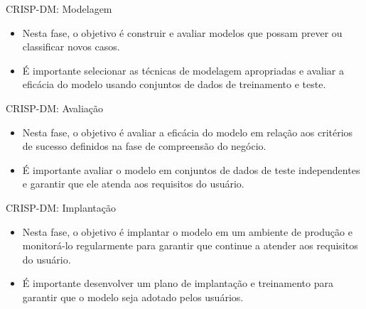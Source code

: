 \documentclass[
  ignorenonframetext,
  aspectratio=169,
]{beamer}
\providecommand{\tightlist}{%
  \setlength{\itemsep}{0pt}\setlength{\parskip}{0pt}}
\begin{document}
\begin{frame}{CRISP-DM: Modelagem}
\label{crisp-dm-modelagem}
\begin{itemize}
\tightlist
\item
  Nesta fase, o objetivo é construir e avaliar modelos que possam prever
  ou classificar novos casos.
\end{itemize}

\pause

\begin{itemize}
\tightlist
\item
  É importante selecionar as técnicas de modelagem apropriadas e avaliar
  a eficácia do modelo usando conjuntos de dados de treinamento e teste.
\end{itemize}
\end{frame}

\begin{frame}{CRISP-DM: Avaliação}
\label{crisp-dm-avaliauxe7uxe3o}
\begin{itemize}
\tightlist
\item
  Nesta fase, o objetivo é avaliar a eficácia do modelo em relação aos
  critérios de sucesso definidos na fase de compreensão do negócio.
\end{itemize}

\pause

\begin{itemize}
\tightlist
\item
  É importante avaliar o modelo em conjuntos de dados de teste
  independentes e garantir que ele atenda aos requisitos do usuário.
\end{itemize}
\end{frame}

\begin{frame}{CRISP-DM: Implantação}
\label{crisp-dm-implantauxe7uxe3o}
\begin{itemize}
\tightlist
\item
  Nesta fase, o objetivo é implantar o modelo em um ambiente de produção
  e monitorá-lo regularmente para garantir que continue a atender aos
  requisitos do usuário.
\end{itemize}

\pause

\begin{itemize}
\tightlist
\item
  É importante desenvolver um plano de implantação e treinamento para
  garantir que o modelo seja adotado pelos usuários.
\end{itemize}
\end{frame}
\end{document}
